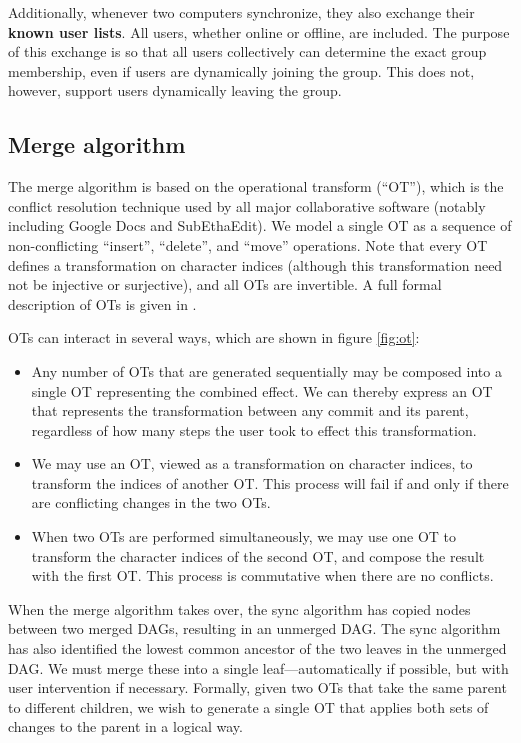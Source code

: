 \documentclass[11pt,titlepage]{article}
\begin{document}
Additionally, whenever two computers synchronize, they also exchange
their \textbf{known user lists}. All users, whether online or offline,
are included. The purpose of this exchange is so that all users
collectively can determine the exact group membership, even if users
are dynamically joining the group. This does not, however, support
users dynamically leaving the group.

\subsection{Merge algorithm}

The merge algorithm is based on the operational transform (``OT''),
which is the conflict resolution technique used by all major
collaborative software (notably including Google Docs and
SubEthaEdit).  We model a single OT as a sequence of non-conflicting
``insert'', ``delete'', and ``move'' operations.  Note that every OT
defines a transformation on character indices (although this
transformation need not be injective or surjective), and all OTs are
invertible.  A full formal description of OTs is given in \cite{wave}.

OTs can interact in several ways, which are shown in figure
\ref{fig:ot}:
\begin{itemize}
\item Any number of OTs that are generated sequentially may be
  composed into a single OT representing the combined effect.  We can
  thereby express an OT that represents the transformation between any
  commit and its parent, regardless of how many steps the user took to
  effect this transformation.
\item We may use an OT, viewed as a transformation on character
  indices, to transform the indices of another OT.  This process will
  fail if and only if there are conflicting changes in the two OTs.
\item When two OTs are performed simultaneously, we may use one OT to
  transform the character indices of the second OT, and compose the
  result with the first OT.  This process is commutative when there
  are no conflicts.
\end{itemize}

When the merge algorithm takes over, the sync algorithm has copied
nodes between two merged DAGs, resulting in an unmerged DAG.  The sync
algorithm has also identified the lowest common ancestor of the two
leaves in the unmerged DAG.  We must merge these into a single
leaf---automatically if possible, but with user intervention if
necessary. Formally, given two OTs that take the same parent to
different children, we wish to generate a single OT that applies both
sets of changes to the parent in a logical way.
\end{document}
